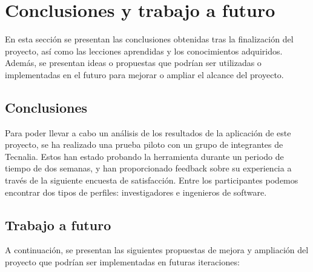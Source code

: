 \section{Conclusiones y trabajo a futuro}
En esta sección se presentan las conclusiones obtenidas tras la finalización 
del proyecto, así como las lecciones aprendidas y los conocimientos adquiridos. 
Además, se presentan ideas o propuestas que podrían ser utilizadas o implementadas 
en el futuro para mejorar o ampliar el alcance del proyecto.

\subsection{Conclusiones}
Para poder llevar a cabo un análisis de los resultados de la aplicación
de este proyecto, se ha realizado una prueba piloto con un grupo de integrantes
de Tecnalia. Estos han estado probando la herramienta durante un periodo de tiempo
de dos semanas, y han proporcionado feedback sobre su experiencia a través de
la siguiente encuesta de satisfacción. Entre los participantes podemos encontrar
dos tipos de perfiles: investigadores e ingenieros de software.

\subsection{Trabajo a futuro}
A continuación, se presentan las siguientes propuestas de mejora y ampliación
del proyecto que podrían ser implementadas en futuras iteraciones:

